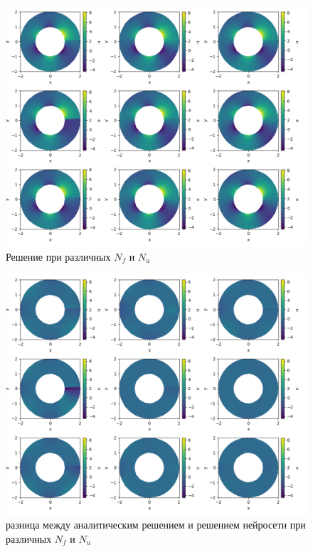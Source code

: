 \documentclass[a4paper,14pt]{extarticle} %
\begin{document}
\begin{figure}[ht]
    \center
    \includegraphics[width=\textwidth]{../plots/termal/solut l = (20x4) Nf=[1000, 5000, 10000] Nu=[100, 500, 1000].png}
    \caption{Решение при различных $N_f$ и $N_u$}
    \label{fig:termal_pred}
\end{figure}

\begin{figure}[ht]
    \center
    \includegraphics[width=\textwidth]{../plots/termal/solut dif l = (20x4) Nf=[1000, 5000, 10000] Nu=[100, 500, 1000].png}
    \caption{разница между аналитическим решением и решением нейросети при различных $N_f$ и $N_u$}
    \label{fig:termal_dif}
\end{figure}
\end{document}
